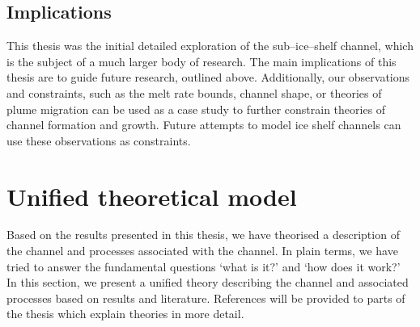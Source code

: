 \subsection{Implications}

This thesis was the initial detailed exploration of the sub--ice--shelf channel, which is the subject of a much larger body of research. The main implications of this thesis are to guide future research, outlined above. Additionally, our observations and constraints, such as the melt rate bounds, channel shape, or theories of plume migration can be used as a case study to further constrain theories of channel formation and growth. Future attempts to model ice shelf channels can use these observations as constraints. 

\section{Unified theoretical model} \label{sec:unified}

Based on the results presented in this thesis, we have theorised a description of the channel and processes associated with the channel.  In plain terms, we have tried to answer the fundamental questions `what is it?' and `how does it work?' In this section, we present a unified theory describing the channel and associated processes based on results and literature.  References will be provided to parts of the thesis which explain theories in more detail.

